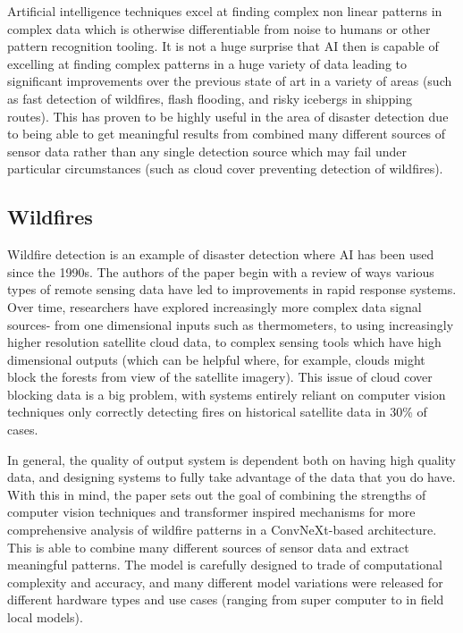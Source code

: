 \documentclass[conference,a4paper]{IEEEtran}
\begin{document}
Artificial intelligence techniques excel at finding complex non linear patterns in complex data which is otherwise differentiable from noise to humans or other pattern recognition tooling. It is not a huge surprise that AI then is capable of excelling at finding complex patterns in a huge variety of data leading to significant improvements over the previous state of art in a variety of areas (such as fast detection of wildfires, flash flooding, and risky icebergs in shipping routes). This has proven to be highly useful in the area of disaster detection due to being able to get meaningful results from combined many different sources of sensor data rather than any single detection source which may fail under particular circumstances (such as cloud cover preventing detection of wildfires).


\subsection{Wildfires}

Wildfire detection is an example of disaster detection where AI has been used since the 1990s. The authors of the paper begin with a review of ways various types of remote sensing data have led to improvements in rapid response systems. Over time, researchers have explored increasingly more complex data signal sources- from one dimensional inputs such as thermometers, to using increasingly higher resolution satellite cloud data, to complex sensing tools which have high dimensional outputs (which can be helpful where, for example, clouds might block the forests from view of the satellite imagery). This issue of cloud cover blocking data is a big problem, with systems entirely reliant on computer vision techniques only correctly detecting fires on historical satellite data in 30\% of cases.

In general, the quality of output system is dependent both on having high quality data, and designing systems to fully take advantage of the data that you do have. With this in mind, the paper sets out the goal of combining the strengths of computer vision techniques and transformer inspired mechanisms for more comprehensive analysis of wildfire patterns in a ConvNeXt-based architecture. This is able to combine many different sources of sensor data and extract meaningful patterns. The model is carefully designed to trade of computational complexity and accuracy, and many different model variations were released for different hardware types and use cases (ranging from super computer to in field local models).
\end{document}
